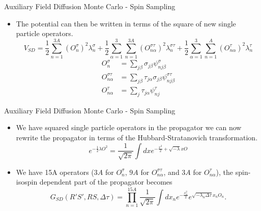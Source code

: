 \documentclass{beamer}
\newcommand{\dt}{\Delta\tau}
\begin{document}
\begin{frame}{Auxiliary Field Diffusion Monte Carlo - Spin Sampling}
\begin{itemize}
   \item The potential can then be written in terms of the square of new single particle operators.
   \begin{equation*}
      V_{SD} = \frac{1}{2}\sum\limits_{n=1}^{3A} \left(O_{n}^{\sigma}\right)^2 \lambda_n^{\sigma}
      + \frac{1}{2}\sum\limits_{\alpha=1}^{3}\sum\limits_{n=1}^{3A} \left(O_{n\alpha}^{\sigma\tau}\right)^2 \lambda_n^{\sigma\tau}
       + \frac{1}{2}\sum\limits_{\alpha=1}^{3}\sum\limits_{n=1}^{A} \left(O_{n\alpha}^{\tau}\right)^2 \lambda_n^{\tau}
   \end{equation*}
   \begin{equation*}
   \begin{split}
      O_{n}^{\sigma} &= \sum\limits_{j\beta} \sigma_{j\beta}\psi_{nj\beta}^{\sigma} \\
      O_{n\alpha}^{\sigma\tau} &= \sum\limits_{j\beta} \tau_{j\alpha}\sigma_{j\beta}\psi_{nj\beta}^{\sigma\tau} \\
      O_{n\alpha}^{\tau} &= \sum\limits_{j} \tau_{j\alpha}\psi_{nj}^{\tau}
   \end{split}
   \end{equation*}
\end{itemize}
\end{frame}

\begin{frame}{Auxiliary Field Diffusion Monte Carlo - Spin Sampling}
\begin{itemize}
   \item We have squared single particle operators in the propagator we can now rewrite the propagator in terms of the Hubbard-Stratanovich transformation.
   \begin{equation*}
      e^{-\frac{1}{2}\lambda O^2} = \frac{1}{\sqrt{2\pi}} \int dx e^{-\frac{x^2}{2} + \sqrt{-\lambda}xO}
   \end{equation*}
   \item We have 15A operators ($3A$ for $O_{n}^{\sigma}$, $9A$ for $O_{n\alpha}^{\sigma\tau}$, and $3A$ for $O_{n\alpha}^{\tau}$), the spin-isospin dependent part of the propagator becomes
   \begin{equation*}
      G_{SD}(R'S',RS,\dt) = \prod\limits_{n=1}^{15A}\frac{1}{\sqrt{2\pi}}\int dx_n e^{-\frac{x_n^2}{2}}e^{\sqrt{-\lambda_n\dt} x_nO_n}.
   \end{equation*}
\end{itemize}
\end{frame}
\end{document}
